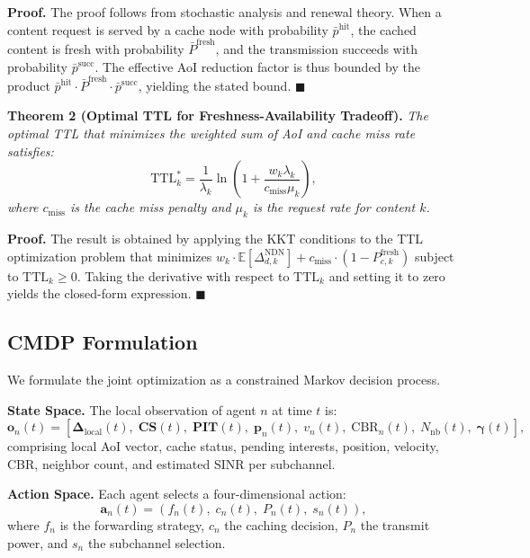 \documentclass[journal]{IEEEtran}
\begin{document}
\textbf{Proof.} The proof follows from stochastic analysis and renewal theory. When a content request is served by a cache node with probability $\bar{p}^{\text{hit}}$, the cached content is fresh with probability $\bar{P}^{\text{fresh}}$, and the transmission succeeds with probability $\bar{p}^{\text{succ}}$. The effective AoI reduction factor is thus bounded by the product $\bar{p}^{\text{hit}} \cdot \bar{P}^{\text{fresh}} \cdot \bar{p}^{\text{succ}}$, yielding the stated bound. \hfill $\blacksquare$

\textbf{Theorem 2 (Optimal TTL for Freshness-Availability Tradeoff).} \emph{The optimal TTL that minimizes the weighted sum of AoI and cache miss rate satisfies:}
\begin{equation} \label{eq:theorem2}
\text{TTL}_k^* = \frac{1}{\lambda_k} \ln\left(1 + \frac{w_k \lambda_k}{c_{\text{miss}} \mu_k}\right),
\end{equation}
\emph{where $c_{\text{miss}}$ is the cache miss penalty and $\mu_k$ is the request rate for content $k$.}

\textbf{Proof.} The result is obtained by applying the KKT conditions to the TTL optimization problem that minimizes $w_k \cdot \mathbb{E}[\Delta_{d,k}^{\text{NDN}}] + c_{\text{miss}} \cdot (1 - P_{c,k}^{\text{fresh}})$ subject to $\text{TTL}_k \geq 0$. Taking the derivative with respect to $\text{TTL}_k$ and setting it to zero yields the closed-form expression. \hfill $\blacksquare$

\subsection{CMDP Formulation} \label{subsec:cmdp}

We formulate the joint optimization as a constrained Markov decision process.

\textbf{State Space.} The local observation of agent $n$ at time $t$ is:
\begin{equation}
\mathbf{o}_n(t) = [\boldsymbol{\Delta}_{\text{local}}(t),\; \mathbf{CS}(t),\; \mathbf{PIT}(t),\; \mathbf{p}_n(t),\; v_n(t),\; \text{CBR}_n(t),\; N_{\text{nb}}(t),\; \boldsymbol{\gamma}(t)],
\end{equation}
comprising local AoI vector, cache status, pending interests, position, velocity, CBR, neighbor count, and estimated SINR per subchannel.

\textbf{Action Space.} Each agent selects a four-dimensional action:
\begin{equation}
\mathbf{a}_n(t) = (f_n(t),\; c_n(t),\; P_n(t),\; s_n(t)),
\end{equation}
where $f_n$ is the forwarding strategy, $c_n$ the caching decision, $P_n$ the transmit power, and $s_n$ the subchannel selection.
\end{document}
